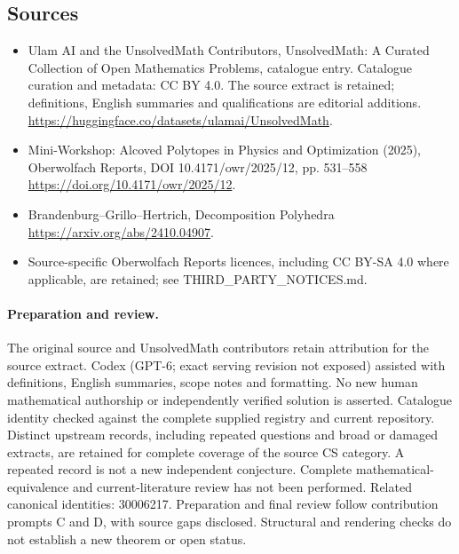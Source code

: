\documentclass[11pt]{article}
\begin{document}
\subsection{Sources}
\begin{itemize}
\item[\hypertarget{source:statement:1}{S1}] Ulam AI and the UnsolvedMath Contributors, UnsolvedMath: A Curated Collection of Open Mathematics Problems, catalogue entry. Catalogue curation and metadata: CC BY 4.0. The source extract is retained; definitions, English summaries and qualifications are editorial additions.
\url{https://huggingface.co/datasets/ulamai/UnsolvedMath}.
\item[\hypertarget{source:statement:2}{S2}] Mini-Workshop: Alcoved Polytopes in Physics and Optimization (2025), Oberwolfach Reports, DOI 10.4171/owr/2025/12, pp. 531--558
\url{https://doi.org/10.4171/owr/2025/12}.
\item[\hypertarget{source:statement:3}{S3}] Brandenburg--Grillo--Hertrich, Decomposition Polyhedra
\url{https://arxiv.org/abs/2410.04907}.
\item Source-specific Oberwolfach Reports licences, including CC BY-SA 4.0 where applicable, are retained; see THIRD\_PARTY\_NOTICES.md.
\end{itemize}
\paragraph{Preparation and review.}
The original source and UnsolvedMath contributors retain attribution for the source extract. Codex (GPT-6; exact serving revision not exposed) assisted with definitions, English summaries, scope notes and formatting. No new human mathematical authorship or independently verified solution is asserted. Catalogue identity checked against the complete supplied registry and current repository. Distinct upstream records, including repeated questions and broad or damaged extracts, are retained for complete coverage of the source CS category. A repeated record is not a new independent conjecture. Complete mathematical-equivalence and current-literature review has not been performed. Related canonical identities: 30006217. Preparation and final review follow contribution prompts C and D, with source gaps disclosed. Structural and rendering checks do not establish a new theorem or open status.
\label{end:statement}
\end{document}
